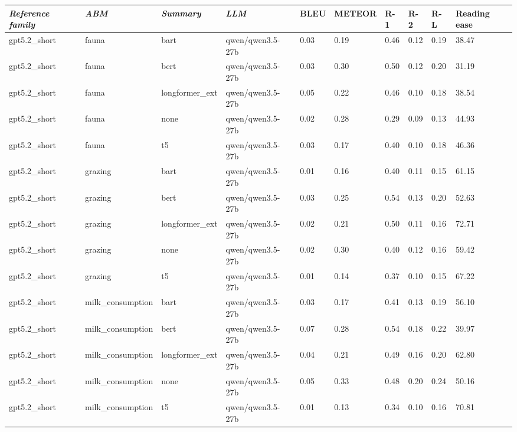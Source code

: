 \begin{tabular}{|l|l|l|l|l|l|l|l|l|l|}
\hline
\textit{\textbf{Reference family}} & \textit{\textbf{ABM}} & \textit{\textbf{Summary}} & \textit{\textbf{LLM}} & BLEU & METEOR & R-1 & R-2 & R-L & Reading ease \\
 \hline
 gpt5.2\_short & fauna & bart & qwen/qwen3.5-27b & 0.03 & 0.19 & 0.46 & 0.12 & 0.19 & 38.47 \\
 \hline
 gpt5.2\_short & fauna & bert & qwen/qwen3.5-27b & 0.03 & 0.30 & 0.50 & 0.12 & 0.20 & 31.19 \\
 \hline
 gpt5.2\_short & fauna & longformer\_ext & qwen/qwen3.5-27b & 0.05 & 0.22 & 0.46 & 0.10 & 0.18 & 38.54 \\
 \hline
 gpt5.2\_short & fauna & none & qwen/qwen3.5-27b & 0.02 & 0.28 & 0.29 & 0.09 & 0.13 & 44.93 \\
 \hline
 gpt5.2\_short & fauna & t5 & qwen/qwen3.5-27b & 0.03 & 0.17 & 0.40 & 0.10 & 0.18 & 46.36 \\
 \hline
 gpt5.2\_short & grazing & bart & qwen/qwen3.5-27b & 0.01 & 0.16 & 0.40 & 0.11 & 0.15 & 61.15 \\
 \hline
 gpt5.2\_short & grazing & bert & qwen/qwen3.5-27b & 0.03 & 0.25 & 0.54 & 0.13 & 0.20 & 52.63 \\
 \hline
 gpt5.2\_short & grazing & longformer\_ext & qwen/qwen3.5-27b & 0.02 & 0.21 & 0.50 & 0.11 & 0.16 & 72.71 \\
 \hline
 gpt5.2\_short & grazing & none & qwen/qwen3.5-27b & 0.02 & 0.30 & 0.40 & 0.12 & 0.16 & 59.42 \\
 \hline
 gpt5.2\_short & grazing & t5 & qwen/qwen3.5-27b & 0.01 & 0.14 & 0.37 & 0.10 & 0.15 & 67.22 \\
 \hline
 gpt5.2\_short & milk\_consumption & bart & qwen/qwen3.5-27b & 0.03 & 0.17 & 0.41 & 0.13 & 0.19 & 56.10 \\
 \hline
 gpt5.2\_short & milk\_consumption & bert & qwen/qwen3.5-27b & 0.07 & 0.28 & 0.54 & 0.18 & 0.22 & 39.97 \\
 \hline
 gpt5.2\_short & milk\_consumption & longformer\_ext & qwen/qwen3.5-27b & 0.04 & 0.21 & 0.49 & 0.16 & 0.20 & 62.80 \\
 \hline
 gpt5.2\_short & milk\_consumption & none & qwen/qwen3.5-27b & 0.05 & 0.33 & 0.48 & 0.20 & 0.24 & 50.16 \\
 \hline
 gpt5.2\_short & milk\_consumption & t5 & qwen/qwen3.5-27b & 0.01 & 0.13 & 0.34 & 0.10 & 0.16 & 70.81 \\
\hline
\end{tabular}
